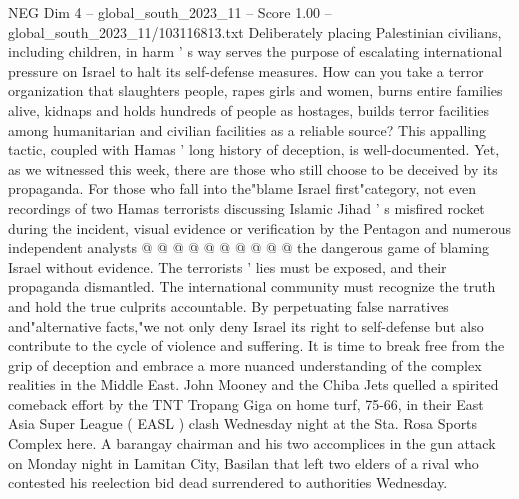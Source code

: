 \begin{textsample}{NEG Dim 4 – global\_south\_2023\_11 – Score 1.00 – global\_south\_2023\_11/103116813.txt}
Deliberately placing Palestinian civilians, including children, in harm ' s way serves the purpose of escalating international pressure on Israel to halt its self-defense measures.
How can you take a terror organization that slaughters people, rapes girls and women, burns entire families alive, kidnaps and holds hundreds of people as hostages, builds terror facilities among humanitarian and civilian facilities as a reliable source?
This appalling tactic, coupled with Hamas ' long history of deception, is well-documented.
Yet, as we witnessed this week, there are those who still choose to be deceived by its propaganda.
For those who fall into the"blame Israel first"category, not even recordings of two Hamas terrorists discussing Islamic Jihad ' s misfired rocket during the incident, visual evidence or verification by the Pentagon and numerous independent analysts @ @ @ @ @ @ @ @ @ @ the dangerous game of blaming Israel without evidence.
The terrorists ' lies must be exposed, and their propaganda dismantled.
The international community must recognize the truth and hold the true culprits accountable.
By perpetuating false narratives and"alternative facts,"we not only deny Israel its right to self-defense but also contribute to the cycle of violence and suffering.
It is time to break free from the grip of deception and embrace a more nuanced understanding of the complex realities in the Middle East.
John Mooney and the Chiba Jets quelled a spirited comeback effort by the TNT Tropang Giga on home turf, 75-66, in their East Asia Super League ( EASL ) clash Wednesday night at the Sta.
Rosa Sports Complex here.
A barangay chairman and his two accomplices in the gun attack on Monday night in Lamitan City, Basilan that left two elders of a rival who contested his reelection bid dead surrendered to authorities Wednesday.

\end{textsample}
